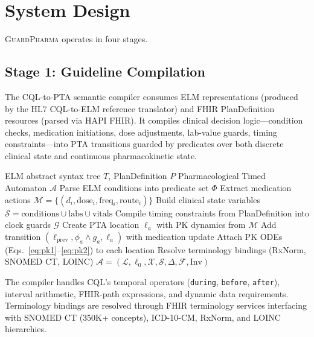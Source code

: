 \documentclass{article}
\theoremstyle{definition}
\begin{document}
\section{System Design}
\label{sec:design}

\textsc{GuardPharma} operates in four stages.

\subsection{Stage 1: Guideline Compilation}

The CQL-to-PTA semantic compiler consumes ELM representations (produced by the HL7 CQL-to-ELM reference translator) and FHIR PlanDefinition resources (parsed via HAPI FHIR). It compiles clinical decision logic---condition checks, medication initiations, dose adjustments, lab-value guards, timing constraints---into PTA transitions guarded by predicates over both discrete clinical state and continuous pharmacokinetic state.

\begin{algorithm}[H]
\caption{CQL-to-PTA Compilation}
\label{alg:compile}
\begin{algorithmic}[1]
\REQUIRE ELM abstract syntax tree $T$, PlanDefinition $P$
\ENSURE Pharmacological Timed Automaton $\mathcal{A}$
\STATE Parse ELM conditions into predicate set $\Phi$
\STATE Extract medication actions $\mathcal{M} = \{(d_i, \text{dose}_i, \text{freq}_i, \text{route}_i)\}$
\STATE Build clinical state variables $\mathcal{S} = \text{conditions} \cup \text{labs} \cup \text{vitals}$
\STATE Compile timing constraints from PlanDefinition into clock guards $\mathcal{G}$
    \STATE Create PTA location $\ell_a$ with PK dynamics from $\mathcal{M}$
    \STATE Add transition $(\ell_{\text{prev}}, \phi_a \wedge g_a, \ell_a)$ with medication update
\ENDFOR
\STATE Attach PK ODEs (Eqs.~\ref{eq:pk1}--\ref{eq:pk2}) to each location
\STATE Resolve terminology bindings (RxNorm, SNOMED CT, LOINC)
\RETURN $\mathcal{A} = (\mathcal{L}, \ell_0, \mathcal{X}, \mathcal{S}, \Delta, \mathcal{F}, \text{Inv})$
\end{algorithmic}
\end{algorithm}

The compiler handles CQL's temporal operators (\texttt{during}, \texttt{before}, \texttt{after}), interval arithmetic, FHIR-path expressions, and dynamic data requirements. Terminology bindings are resolved through FHIR terminology services interfacing with SNOMED CT (350K+ concepts), ICD-10-CM, RxNorm, and LOINC hierarchies.
\end{document}
